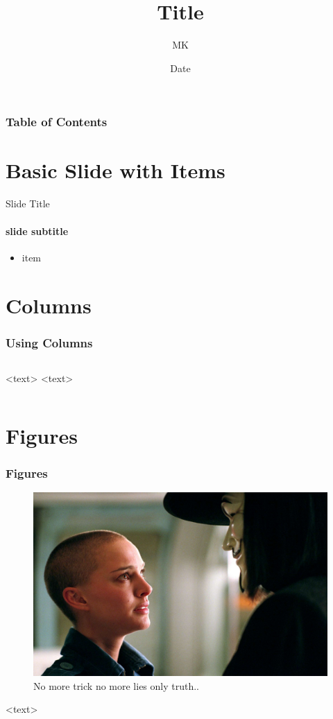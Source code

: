 \documentclass{beamer}
\title{Title}
\author{MK}
\institute{}
\date{Date}
\begin{document}
	\frame{\titlepage}
	\begin{frame}
		\frametitle{Table of Contents}
		\tableofcontents
	\end{frame}
\section{Basic Slide with Items}
\begin{frame}{Slide Title}
	\framesubtitle{slide subtitle}
	\begin{itemize}
		\item item
	\end{itemize}
\end{frame}	
\section{Columns}
\begin{frame}
	\frametitle{Using Columns}
	\begin{columns}
		<text>
		<text>
	\end{columns}
\end{frame}


\section{Figures}
\begin{frame}	
\frametitle{Figures}
\begin{figure}
	\includegraphics[scale=0.3]{figures/v_for_vendetta-2.jpg}
	\caption{No more trick no more lies only truth..}
\end{figure}
<text> 
\end{frame}
\end{document}
